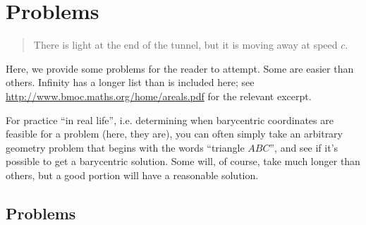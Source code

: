 \chapter{Problems}
\begin{quote}
  There is light at the end of the tunnel, but it is moving away at speed $c$.
\end{quote}


Here, we provide some problems for the reader to attempt.  Some are easier than others.  Infinity \cite{infinity} has a longer list than is included here; see \url{http://www.bmoc.maths.org/home/areals.pdf} for the relevant excerpt.
\newcommand{\sollink}[1]{}

For practice ``in real life'', i.e. determining when barycentric coordinates are feasible for a problem (here, they are), you can often simply take an arbitrary geometry problem that begins with the words ``triangle $ABC$'', and see if it's possible to get a barycentric solution.  Some will, of course, take much longer than others, but a good portion will have a reasonable solution.

\section{Problems}

